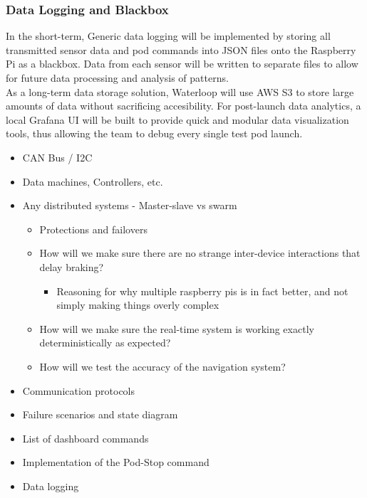 \documentclass[main.tex]{subfiles}
\begin{document}
    \subsubsection{Data Logging and Blackbox}
    In the short-term, Generic data logging will be implemented by storing all transmitted sensor data and pod commands into JSON files onto the Raspberry Pi as a blackbox. Data from each sensor will be written to separate files to allow for future data processing and analysis of patterns.\\
    As a long-term data storage solution, Waterloop will use AWS S3 to store large amounts of data without sacrificing accesibility. For post-launch data analytics, a local Grafana UI will be built to provide quick and modular data visualization tools, thus allowing the team to debug every single test pod launch.
    \begin{itemize}
        \item CAN Bus / I2C
        \item Data machines, Controllers, etc.
        \item Any distributed systems - Master-slave vs swarm
        \begin{itemize}
            \item Protections and failovers
            \item How will we make sure there are no strange inter-device interactions that delay braking?
            \begin{itemize}
                \item Reasoning for why multiple raspberry pis is in fact better, and not simply making things overly complex
            \end{itemize}
            \item How will we make sure the real-time system is working exactly deterministically as expected?
            \item How will we test the accuracy of the navigation system?
        \end{itemize}
        \item Communication protocols
        \item Failure scenarios and state diagram
        \item List of dashboard commands
        \item Implementation of the Pod-Stop command
        \item Data logging
    \end{itemize}
\end{document}
